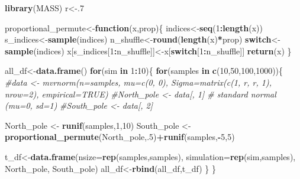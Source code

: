 \documentclass[]{book}
\newenvironment{Shaded}{\begin{snugshade}}{\end{snugshade}}
\newcommand{\CommentTok}[1]{\textcolor[rgb]{0.56,0.35,0.01}{\textit{#1}}}
\newcommand{\ControlFlowTok}[1]{\textcolor[rgb]{0.13,0.29,0.53}{\textbf{#1}}}
\newcommand{\DataTypeTok}[1]{\textcolor[rgb]{0.13,0.29,0.53}{#1}}
\newcommand{\DecValTok}[1]{\textcolor[rgb]{0.00,0.00,0.81}{#1}}
\newcommand{\KeywordTok}[1]{\textcolor[rgb]{0.13,0.29,0.53}{\textbf{#1}}}
\newcommand{\NormalTok}[1]{#1}
\newcommand{\OperatorTok}[1]{\textcolor[rgb]{0.81,0.36,0.00}{\textbf{#1}}}
\newcommand{\StringTok}[1]{\textcolor[rgb]{0.31,0.60,0.02}{#1}}
\begin{document}
\begin{Shaded}
\begin{Highlighting}[]
\KeywordTok{library}\NormalTok{(MASS)}
\NormalTok{r<-.}\DecValTok{7}

\NormalTok{proportional_permute<-}\ControlFlowTok{function}\NormalTok{(x,prop)\{}
\NormalTok{  indices<-}\KeywordTok{seq}\NormalTok{(}\DecValTok{1}\OperatorTok{:}\KeywordTok{length}\NormalTok{(x))}
\NormalTok{  s_indices<-}\KeywordTok{sample}\NormalTok{(indices)}
\NormalTok{  n_shuffle<-}\KeywordTok{round}\NormalTok{(}\KeywordTok{length}\NormalTok{(x)}\OperatorTok{*}\NormalTok{prop)}
  \ControlFlowTok{switch}\NormalTok{<-}\KeywordTok{sample}\NormalTok{(indices)}
\NormalTok{  x[s_indices[}\DecValTok{1}\OperatorTok{:}\NormalTok{n_shuffle]]<-x[}\ControlFlowTok{switch}\NormalTok{[}\DecValTok{1}\OperatorTok{:}\NormalTok{n_shuffle]]}
  \KeywordTok{return}\NormalTok{(x)}
\NormalTok{\}}

\NormalTok{all_df<-}\KeywordTok{data.frame}\NormalTok{()}
\ControlFlowTok{for}\NormalTok{(sim }\ControlFlowTok{in} \DecValTok{1}\OperatorTok{:}\DecValTok{10}\NormalTok{)\{}
  \ControlFlowTok{for}\NormalTok{(samples }\ControlFlowTok{in} \KeywordTok{c}\NormalTok{(}\DecValTok{10}\NormalTok{,}\DecValTok{50}\NormalTok{,}\DecValTok{100}\NormalTok{,}\DecValTok{1000}\NormalTok{))\{}
    \CommentTok{#data <- mvrnorm(n=samples, mu=c(0, 0), Sigma=matrix(c(1, r, r, 1), nrow=2), empirical=TRUE)}
    \CommentTok{#North_pole <- data[, 1]  # standard normal (mu=0, sd=1)}
    \CommentTok{#South_pole <- data[, 2] }
    
\NormalTok{    North_pole <-}\StringTok{ }\KeywordTok{runif}\NormalTok{(samples,}\DecValTok{1}\NormalTok{,}\DecValTok{10}\NormalTok{)}
\NormalTok{    South_pole <-}\StringTok{ }\KeywordTok{proportional_permute}\NormalTok{(North_pole,.}\DecValTok{5}\NormalTok{)}\OperatorTok{+}\KeywordTok{runif}\NormalTok{(samples,}\OperatorTok{-}\DecValTok{5}\NormalTok{,}\DecValTok{5}\NormalTok{)}

\NormalTok{    t_df<-}\KeywordTok{data.frame}\NormalTok{(}\DataTypeTok{nsize=}\KeywordTok{rep}\NormalTok{(samples,samples),}
                   \DataTypeTok{simulation=}\KeywordTok{rep}\NormalTok{(sim,samples),}
\NormalTok{                                  North_pole,}
\NormalTok{                                  South_pole)}
\NormalTok{  all_df<-}\KeywordTok{rbind}\NormalTok{(all_df,t_df)}
\NormalTok{  \}}
\NormalTok{\}}


\end{Highlighting}
\end{Shaded}
\end{document}
